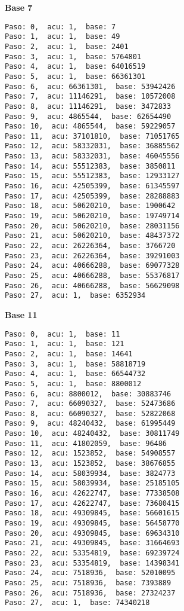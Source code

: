 \documentclass[a4paper]{article}
\begin{document}
\textbf{Base 7}
\begin{verbatim}
Paso: 0,  acu: 1,  base: 7  
Paso: 1,  acu: 1,  base: 49  
Paso: 2,  acu: 1,  base: 2401  
Paso: 3,  acu: 1,  base: 5764801  
Paso: 4,  acu: 1,  base: 64016519  
Paso: 5,  acu: 1,  base: 66361301  
Paso: 6,  acu: 66361301,  base: 53942426  
Paso: 7,  acu: 11146291,  base: 10572008  
Paso: 8,  acu: 11146291,  base: 3472833  
Paso: 9,  acu: 4865544,  base: 62654490  
Paso: 10,  acu: 4865544,  base: 59229057  
Paso: 11,  acu: 37101810,  base: 71051765  
Paso: 12,  acu: 58332031,  base: 36885562  
Paso: 13,  acu: 58332031,  base: 46045556  
Paso: 14,  acu: 55512383,  base: 3850811  
Paso: 15,  acu: 55512383,  base: 12933127  
Paso: 16,  acu: 42505399,  base: 61345597  
Paso: 17,  acu: 42505399,  base: 28288883  
Paso: 18,  acu: 50620210,  base: 1900642  
Paso: 19,  acu: 50620210,  base: 19749714  
Paso: 20,  acu: 50620210,  base: 28031156  
Paso: 21,  acu: 50620210,  base: 48437372  
Paso: 22,  acu: 26226364,  base: 3766720  
Paso: 23,  acu: 26226364,  base: 39291003  
Paso: 24,  acu: 40666288,  base: 69077328  
Paso: 25,  acu: 40666288,  base: 55376817  
Paso: 26,  acu: 40666288,  base: 56629098  
Paso: 27,  acu: 1,  base: 6352934  
\end{verbatim}

\textbf{Base 11}
\begin{verbatim}
Paso: 0,  acu: 1,  base: 11  
Paso: 1,  acu: 1,  base: 121  
Paso: 2,  acu: 1,  base: 14641  
Paso: 3,  acu: 1,  base: 58818719  
Paso: 4,  acu: 1,  base: 66544732  
Paso: 5,  acu: 1,  base: 8800012  
Paso: 6,  acu: 8800012,  base: 30883746  
Paso: 7,  acu: 66090327,  base: 52473686  
Paso: 8,  acu: 66090327,  base: 52822068  
Paso: 9,  acu: 48240432,  base: 61995449  
Paso: 10,  acu: 48240432,  base: 30811749  
Paso: 11,  acu: 41802059,  base: 96486  
Paso: 12,  acu: 1523852,  base: 54908557  
Paso: 13,  acu: 1523852,  base: 38676855  
Paso: 14,  acu: 58039934,  base: 3824773  
Paso: 15,  acu: 58039934,  base: 25185105  
Paso: 16,  acu: 42622747,  base: 77338508  
Paso: 17,  acu: 42622747,  base: 73680415  
Paso: 18,  acu: 49309845,  base: 56601615  
Paso: 19,  acu: 49309845,  base: 56458770  
Paso: 20,  acu: 49309845,  base: 69634310  
Paso: 21,  acu: 49309845,  base: 31664693  
Paso: 22,  acu: 53354819,  base: 69239724  
Paso: 23,  acu: 53354819,  base: 14398341  
Paso: 24,  acu: 7518936,  base: 52010095  
Paso: 25,  acu: 7518936,  base: 7393889  
Paso: 26,  acu: 7518936,  base: 27324237  
Paso: 27,  acu: 1,  base: 74340218  
\end{verbatim}
\end{document}
